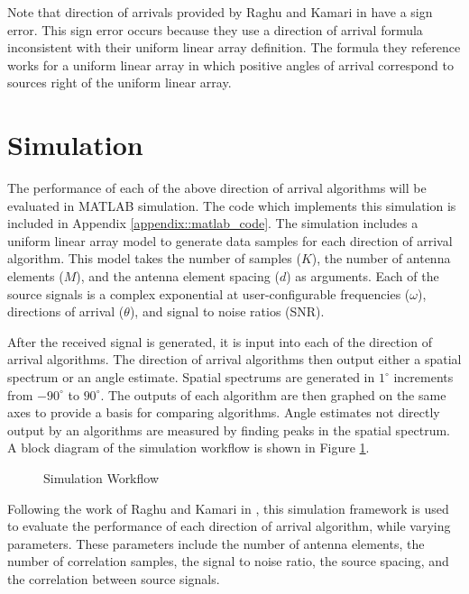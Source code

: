 \documentclass[conference]{IEEEtran}
\begin{document}
		Note that direction of arrivals provided by Raghu and Kamari in \cite{doa_algorithms_raghu} have a sign error. This sign error occurs because they use a direction of arrival formula inconsistent with their uniform linear array definition. The formula they reference works for a uniform linear array in which positive angles of arrival correspond to sources right of the uniform linear array.
		
	\section{Simulation}
	
		The performance of each of the above direction of arrival algorithms will be evaluated in MATLAB simulation. The code which implements this simulation is included in Appendix \ref{appendix::matlab_code}. The simulation includes a uniform linear array model to generate data samples for each direction of arrival algorithm. This model takes the number of samples ($K$), the number of antenna elements ($M$), and the antenna element spacing ($d$) as arguments. Each of the source signals is a complex exponential at user-configurable frequencies ($\omega$), directions of arrival ($\theta$), and signal to noise ratios (SNR).
		
		After the received signal is generated, it is input into each of the direction of arrival algorithms. The direction of arrival algorithms then output either a spatial spectrum or an angle estimate. Spatial spectrums are generated in $1^{\circ}$ increments from $-90^{\circ}$ to $90^{\circ}$. The outputs of each algorithm are then graphed on the same axes to provide a basis for comparing algorithms. Angle estimates not directly output by an algorithms are measured by finding peaks in the spatial spectrum. A block diagram of the simulation workflow is shown in Figure \ref{fig::sim_workflow}.
		
		\begin{figure}[H]
			\centerline{}
			\caption{Simulation Workflow}
			\label{fig::sim_workflow}
		\end{figure}
		
		Following the work of Raghu and Kamari in \cite{doa_algorithms_raghu}, this simulation framework is used to evaluate the performance of each direction of arrival algorithm, while varying parameters. These parameters include the number of antenna elements, the number of correlation samples, the signal to noise ratio, the source spacing, and the correlation between source signals.
		
\end{document}
